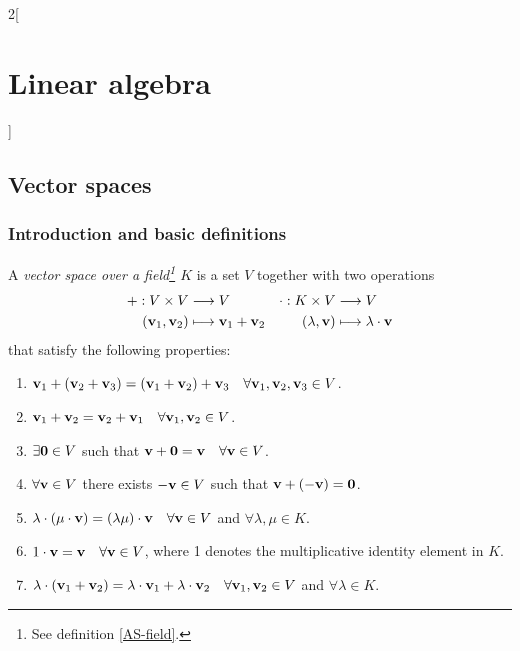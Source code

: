 \documentclass[../../../main.tex]{subfiles}
\begin{document}
\begin{multicols}{2}[\section{Linear algebra}]
  \subsection{Vector spaces}
  \subsubsection{Introduction and basic definitions}
  \begin{definition}
    A \textit{vector space over a field\footnote{See definition \ref{AS-field}.} $K$} is a set $V$ together with two operations
    \begin{align*}
      +:V\times V                                 & \longrightarrow V                                      & \cdot:K\times V              & \longrightarrow V                           \\
      (\boldsymbol{\mathrm{v}}_1,\boldsymbol{\mathrm{v}}_2) & \longmapsto \boldsymbol{\mathrm{v}}_1+ \boldsymbol{\mathrm{v}}_2 & (\lambda,\boldsymbol{\mathrm{v}}) & \longmapsto \lambda\cdot \boldsymbol{\mathrm{v}}
    \end{align*}
    that satisfy the following properties:
    \begin{enumerate}
      \item $\boldsymbol{\mathrm{v}}_1+(\boldsymbol{\mathrm{v}}_2+\boldsymbol{\mathrm{v}}_3)=(\boldsymbol{\mathrm{v}}_1+\boldsymbol{\mathrm{v}}_2)+\boldsymbol{\mathrm{v}}_3\quad\forall\boldsymbol{\mathrm{v}}_1,\boldsymbol{\mathrm{v}}_2,\boldsymbol{\mathrm{v}}_3\in V$.
      \item $\boldsymbol{\mathrm{v}}_1+\boldsymbol{\mathrm{v}}_2=\boldsymbol{\mathrm{v}}_2+\boldsymbol{\mathrm{v}}_1\quad\forall\boldsymbol{\mathrm{v}}_1,\boldsymbol{\mathrm{v}}_2\in V$.
      \item $\exists\boldsymbol{\mathrm{0}}\in V$ such that $\boldsymbol{\mathrm{v}}+\boldsymbol{\mathrm{0}}=\boldsymbol{\mathrm{v}}\quad\forall\boldsymbol{\mathrm{v}}\in V$.
      \item $\forall\boldsymbol{\mathrm{v}}\in V$ there exists $-\boldsymbol{\mathrm{v}}\in V$ such that $\boldsymbol{\mathrm{v}}+(-\boldsymbol{\mathrm{v}})=\boldsymbol{\mathrm{0}}$.
      \item $\lambda\cdot(\mu\cdot\boldsymbol{\mathrm{v}})=(\lambda\mu)\cdot\boldsymbol{\mathrm{v}}\quad\forall\boldsymbol{\mathrm{v}}\in V$ and $\forall\lambda,\mu\in K$.
      \item $1\cdot\boldsymbol{\mathrm{v}}=\boldsymbol{\mathrm{v}}\quad\forall\boldsymbol{\mathrm{v}}\in V$, where 1 denotes the multiplicative identity element in $K$.
      \item $\lambda\cdot(\boldsymbol{\mathrm{v}}_1+\boldsymbol{\mathrm{v}}_2)=\lambda\cdot\boldsymbol{\mathrm{v}}_1+\lambda\cdot\boldsymbol{\mathrm{v}}_2\quad\forall\boldsymbol{\mathrm{v}}_1,\boldsymbol{\mathrm{v}}_2\in V$ and $\forall\lambda\in K$.

\end{enumerate}
\end{definition}
\end{multicols}
\end{document}
